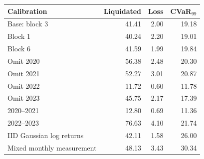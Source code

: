 \begin{tabular}{lrrr}
\toprule
Calibration & Liquidated & Loss & CVaR$_{99}$ \\
\midrule
Base: block 3 & 41.41 & 2.00 & 19.18 \\
Block 1 & 40.24 & 2.20 & 19.01 \\
Block 6 & 41.59 & 1.99 & 19.84 \\
Omit 2020 & 56.38 & 2.48 & 20.30 \\
Omit 2021 & 52.27 & 3.01 & 20.87 \\
Omit 2022 & 11.72 & 0.60 & 11.78 \\
Omit 2023 & 45.75 & 2.17 & 17.39 \\
2020--2021 & 12.80 & 0.69 & 11.36 \\
2022--2023 & 76.63 & 4.10 & 21.74 \\
IID Gaussian log returns & 42.11 & 1.58 & 26.00 \\
Mixed monthly measurement & 48.13 & 3.43 & 30.34 \\
\bottomrule
\end{tabular}
